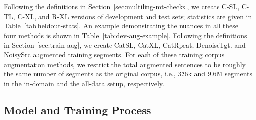 Following the definitions in Section~\ref{sec:multiling-mt-checks}, we create C-SL, C-TL, C-XL, and R-XL versions of development and test sets; statistics are given in Table~\ref{tab:heldout-stats}. 
An example demonstrating the nuances in all these four methods is shown in Table~\ref{tab:dev-aug-example}. 
Following the definitions in Section~\ref{sec:train-aug}, we create CatSL, CatXL, CatRpeat, DenoiseTgt, and NoisySrc augmented training segments. 
For each of these training corpus augmentation methods, we restrict the total augmented sentences to be roughly the same number of segments as the original corpus, i.e., 326k and 9.6M segments in the in-domain and the all-data setup, respectively.


\subsection{Model and Training Process}


